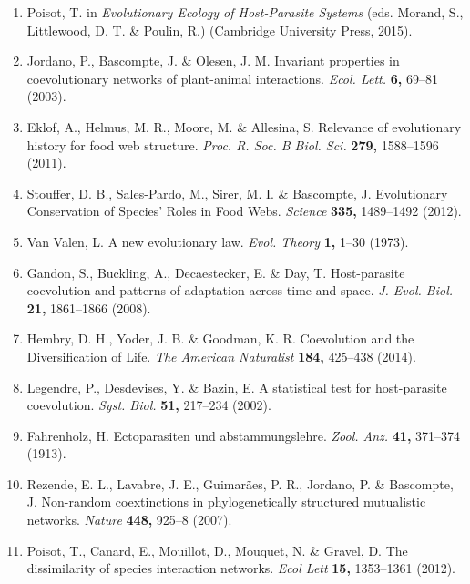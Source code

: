 \documentclass{nature}
\begin{document}
\begin{enumerate}
\item Poisot, T. in \emph{Evolutionary Ecology of
Host-Parasite Systems} (eds. Morand, S., Littlewood, D. T. \& Poulin,
R.) (Cambridge University Press, 2015).

\item Jordano, P., Bascompte, J. \& Olesen, J. M. Invariant
properties in coevolutionary networks of plant-animal interactions.
\emph{Ecol. Lett.} \textbf{6,} 69--81 (2003).

\item Eklof, A., Helmus, M. R., Moore, M. \& Allesina, S. Relevance of
evolutionary history for food web structure. \emph{Proc. R. Soc. B Biol. Sci.}
\textbf{279,} 1588--1596 (2011).

\item Stouffer, D. B., Sales-Pardo, M., Sirer, M. I. \& Bascompte,
J. Evolutionary Conservation of Species' Roles in Food
Webs. \emph{Science} \textbf{335,} 1489--1492 (2012).

\item Van Valen, L. A new evolutionary law. \emph{Evol.
Theory} \textbf{1,} 1--30 (1973).

\item Gandon, S., Buckling, A., Decaestecker, E. \& Day, T.
Host-parasite coevolution and patterns of adaptation across time and
space. \emph{J. Evol. Biol.} \textbf{21,} 1861--1866 (2008).

\item Hembry, D. H., Yoder, J. B. \& Goodman, K. R.
Coevolution and the Diversification of Life. \emph{The American
Naturalist} \textbf{184,} 425--438 (2014).

\item Legendre, P., Desdevises, Y. \& Bazin, E. A statistical
test for host-parasite coevolution. \emph{Syst. Biol.} \textbf{51,}
217--234 (2002).

\item Fahrenholz, H. Ectoparasiten und abstammungslehre.
\emph{Zool. Anz.} \textbf{41,} 371--374 (1913).

\item Rezende, E. L., Lavabre, J. E., Guimarães, P. R., Jordano, P. \&
Bascompte, J. Non-random coextinctions in phylogenetically
structured mutualistic networks. \emph{Nature} \textbf{448,} 925--8
(2007).

\item Poisot, T., Canard, E., Mouillot, D., Mouquet, N. \& Gravel,
D. The dissimilarity of species interaction networks.
\emph{Ecol Lett} \textbf{15,} 1353--1361 (2012).


\end{enumerate}
\end{document}
